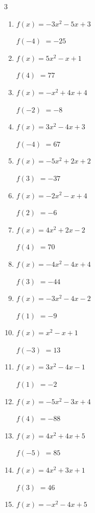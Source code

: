 \begin{multicols}{3}
\begin{enumerate}
$f(5)$
        $= -139$

\columnbreak %

  \item $f(x)=-3x^{2}-5x+3$

$f(-4)$
        $= -25$

  \item $f(x)=5x^{2}-x+1$

$f(4)$
        $= 77$

  \item $f(x)=-x^{2}+4x+4$

$f(-2)$
        $= -8$

  \item $f(x)=3x^{2}-4x+3$

$f(-4)$
        $= 67$

  \item $f(x)=-5x^{2}+2x+2$

$f(3)$
        $= -37$

  \item $f(x)=-2x^{2}-x+4$

$f(2)$
        $= -6$

  \item $f(x)=4x^{2}+2x-2$

$f(4)$
        $= 70$

  \item $f(x)=-4x^{2}-4x+4$

$f(3)$
        $= -44$

  \item $f(x)=-3x^{2}-4x-2$

$f(1)$
        $= -9$

  \item $f(x)=x^{2}-x+1$

$f(-3)$
        $= 13$

  \item $f(x)=3x^{2}-4x-1$

$f(1)$
        $= -2$

  \item $f(x)=-5x^{2}-3x+4$

$f(4)$
        $= -88$

  \item $f(x)=4x^{2}+4x+5$

$f(-5)$
        $= 85$

  \item $f(x)=4x^{2}+3x+1$

$f(3)$
        $= 46$

  \item $f(x)=-x^{2}-4x+5$


\end{enumerate}
\end{multicols}
